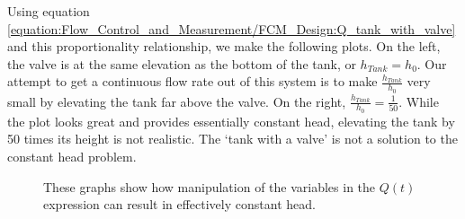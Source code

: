 \documentclass[letterpaper,10pt,english]{sphinxmanual}
\let\sphinxpxdimen\pdfpxdimen\else\newdimen\sphinxpxdimen
\begin{document}
Using equation \eqref{equation:Flow_Control_and_Measurement/FCM_Design:Q_tank_with_valve} and this proportionality relationship, we make the following plots. On the left, the valve is at the same elevation as the bottom of the tank, or \(h_{Tank} = h_0\). Our attempt to get a continuous flow rate out of this system is to make \(\frac{h_{Tank}}{h_0}\) very small by elevating the tank far above the valve. On the right, \(\frac{h_{Tank}}{h_0} = \frac{1}{50}\). While the plot looks great and provides essentially constant head, elevating the tank by 50 times its height is not realistic. The ‘tank with a valve’ is not a solution to the constant head problem.

\begin{figure}[htbp]
\centering
\capstart

\noindent\sphinxincludegraphics[width=600\sphinxpxdimen]{{tank_valve_play}.png}
\caption{These graphs show how manipulation of the variables in the \(Q(t)\) expression can result in effectively constant head.}\label{\detokenize{Flow_Control_and_Measurement/FCM_Design:id14}}\label{\detokenize{Flow_Control_and_Measurement/FCM_Design:tank-valve-play}}\end{figure}
\end{document}
